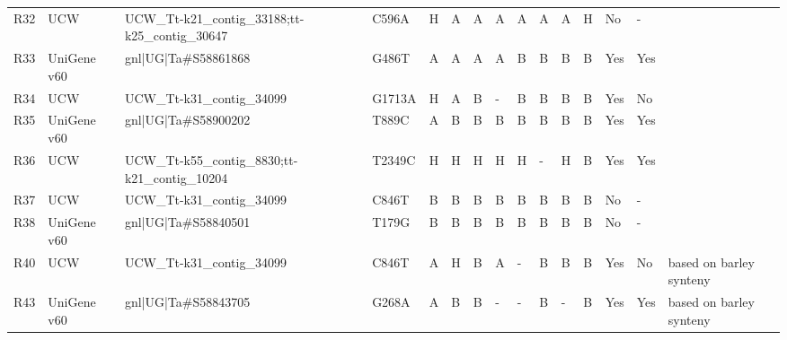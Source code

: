 \begin{sidewaystable}
\begin{localsize}{6}{9}
\begin{tabular}{llllllll|lllllll}
 R32        & UCW         & UCW\_Tt-k21\_contig\_33188;tt-k25\_contig\_30647                     & C596A  & H      & A         & A        & A        & A            & A         & A         & H     & No            & -                      &                         \\
 R33        & UniGene v60 & gnl|UG|Ta\#S58861868                                             & G486T  & A      & A         & A        & A        & B            & B         & B         & B     & Yes           & Yes                    &                         \\
 R34        & UCW         & UCW\_Tt-k31\_contig\_34099                                         & G1713A & H      & A         & B        & -        & B            & B         & B         & B     & Yes           & No                     &                         \\
 R35        & UniGene v60 & gnl|UG|Ta\#S58900202                                             & T889C  & A      & B         & B        & B        & B            & B         & B         & B     & Yes           & Yes                    &                         \\
 R36        & UCW         & UCW\_Tt-k55\_contig\_8830;tt-k21\_contig\_10204                      & T2349C & H      & H         & H        & H        & H            & -         & H         & B     & Yes           & Yes                    &                         \\
 R37        & UCW         & UCW\_Tt-k31\_contig\_34099                                         & C846T  & B      & B         & B        & B        & B            & B         & B         & B     & No            & -                      &                         \\
 R38        & UniGene v60 & gnl|UG|Ta\#S58840501                                             & T179G  & B      & B         & B        & B        & B            & B         & B         & B     & No            & -                      &                         \\
 R40        & UCW         & UCW\_Tt-k31\_contig\_34099                                         & C846T  & A      & H         & B        & A        & -            & B         & B         & B     & Yes           & No                     & based on barley synteny \\
 R43        & UniGene v60 & gnl|UG|Ta\#S58843705                                             & G268A  & A      & B         & B        & -        & -            & B         & -         & B     & Yes           & Yes                    & based on barley synteny \\
\bottomrule
\end{tabular}
\end{localsize}
\end{sidewaystable}
